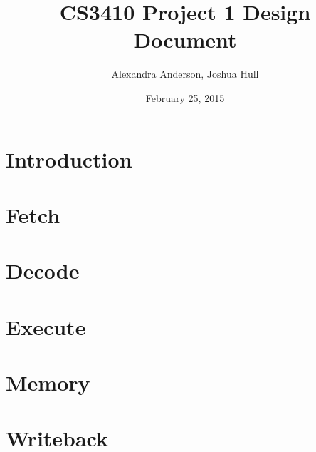\documentclass{article}
\title{CS3410 Project 1 Design Document}
\date{February 25, 2015}
\author{Alexandra Anderson, Joshua Hull}
\begin{document}
\maketitle

\section*{Introduction}


\section*{Fetch}


\section*{Decode}


\section*{Execute}


\section*{Memory}


\section*{Writeback}
\end{document}
